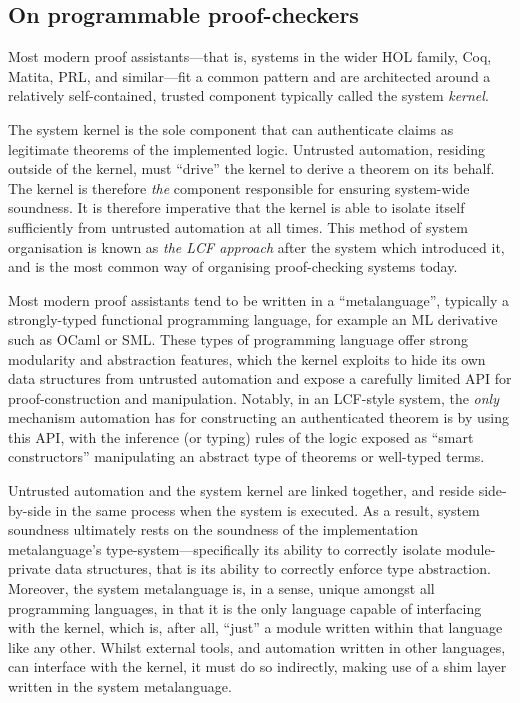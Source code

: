 \documentclass[a4paper, UKenglish, cleveref, autoref, thm-restate]{lipics-v2021}
\begin{document}
\subsection{On programmable proof-checkers}

Most modern proof assistants---that is, systems in the wider HOL family, Coq, Matita, PRL, and similar---fit a common pattern and are architected around a relatively self-contained, trusted component typically called the system \emph{kernel}.

The system kernel is the sole component that can authenticate claims as legitimate theorems of the implemented logic.
Untrusted automation, residing outside of the kernel, must ``drive'' the kernel to derive a theorem on its behalf.
The kernel is therefore \emph{the} component responsible for ensuring system-wide soundness.
It is therefore imperative that the kernel is able to isolate itself sufficiently from untrusted automation at all times.
This method of system organisation is known as \emph{the LCF approach} after the system which introduced it, and is the most common way of organising proof-checking systems today.

Most modern proof assistants tend to be written in a ``metalanguage'', typically a strongly-typed functional programming language, for example an ML derivative such as OCaml or SML.
These types of programming language offer strong modularity and abstraction features, which the kernel exploits to hide its own data structures from untrusted automation and expose a carefully limited API for proof-construction and manipulation.
Notably, in an LCF-style system, the \emph{only} mechanism automation has for constructing an authenticated theorem is by using this API, with the inference (or typing) rules of the logic exposed as ``smart constructors'' manipulating an abstract type of theorems or well-typed terms.

Untrusted automation and the system kernel are linked together, and reside side-by-side in the same process when the system is executed.
As a result, system soundness ultimately rests on the soundness of the implementation metalanguage's type-system---specifically its ability to correctly isolate module-private data structures, that is its ability to correctly enforce type abstraction.
Moreover, the system metalanguage is, in a sense, unique amongst all programming languages, in that it is the only language capable of interfacing with the kernel, which is, after all, ``just'' a module written within that language like any other.
Whilst external tools, and automation written in other languages, can interface with the kernel, it must do so indirectly, making use of a shim layer written in the system metalanguage.
\end{document}
